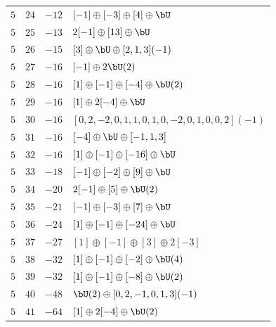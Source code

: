\begin{center}
\begin{longtable}{llll}
 \(5\) & \(24\) & \(-12\) & \([-1] \oplus [-3] \oplus [4] \oplus \bU\) \\
 \(5\) & \(25\) & \(-13\) & \(2 [-1] \oplus [13] \oplus \bU\) \\
 \(5\) & \(26\) & \(-15\) & \([3] \oplus \bU \oplus [2, 1, 3](-1)\) \\
 \(5\) & \(27\) & \(-16\) & \([-1] \oplus 2 \bU(2)\) \\
 \(5\) & \(28\) & \(-16\) & \([1] \oplus [-1] \oplus [-4] \oplus \bU(2)\) \\
 \(5\) & \(29\) & \(-16\) & \([1] \oplus 2 [-4] \oplus \bU\) \\
 \(5\) & \(30\) & \(-16\) & \([0, 2, -2, 0, 1, 1, 0, 1, 0, -2, 0, 1, 0, 0, 2](-1)\) \\
 \(5\) & \(31\) & \(-16\) & \([-4] \oplus \bU \oplus [-1, 1, 3]\) \\
 \(5\) & \(32\) & \(-16\) & \([1] \oplus [-1] \oplus [-16] \oplus \bU\) \\
 \(5\) & \(33\) & \(-18\) & \([-1] \oplus [-2] \oplus [9] \oplus \bU\) \\
 \(5\) & \(34\) & \(-20\) & \(2 [-1] \oplus [5] \oplus \bU(2)\) \\
 \(5\) & \(35\) & \(-21\) & \([-1] \oplus [-3] \oplus [7] \oplus \bU\) \\
 \(5\) & \(36\) & \(-24\) & \([1] \oplus [-1] \oplus [-24] \oplus \bU\) \\
 \(5\) & \(37\) & \(-27\) & \([1] \oplus [-1] \oplus [3] \oplus 2[-3]\) \\
 \(5\) & \(38\) & \(-32\) & \([1] \oplus [-1] \oplus [-2] \oplus \bU(4)\) \\
 \(5\) & \(39\) & \(-32\) & \([1] \oplus [-1] \oplus [-8] \oplus \bU(2)\) \\
 \(5\) & \(40\) & \(-48\) & \(\bU(2) \oplus [0, 2, -1, 0, 1, 3](-1)\) \\
 \(5\) & \(41\) & \(-64\) & \([1] \oplus 2 [-4] \oplus \bU(2)\) \\

\end{longtable}
\end{center}
